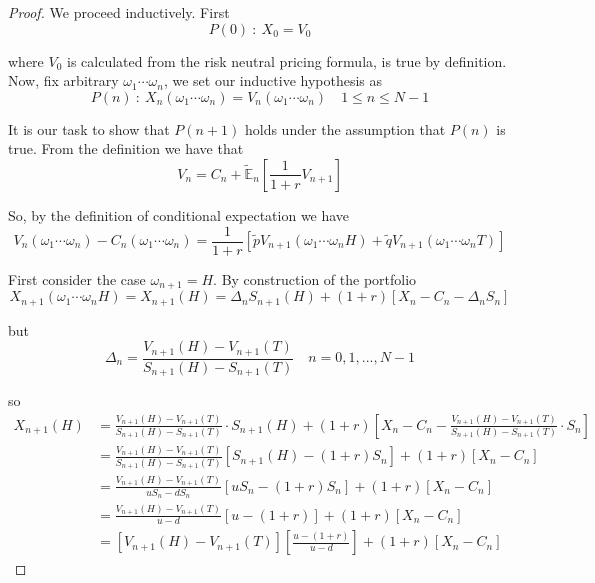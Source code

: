 \documentclass[12pt]{article}
\newlength\tindent
\renewcommand{\indent}{\hspace*{\tindent}}
\newcommand{\E}{\mathbb E}
\begin{document}
\begin{proof} We proceed inductively. First
\begin{equation*}
	P(0)~:~X_0 = V_0
\end{equation*}

where $V_0$ is calculated from the risk neutral pricing formula, is true by definition. Now, fix arbitrary $\omega_1\cdots\omega_n$, we set our inductive hypothesis as
\begin{equation*}
	P(n)~:~X_n(\omega_1\cdots\omega_n) = V_n(\omega_1\cdots\omega_n) \quad 1 \leq n \leq N - 1
\end{equation*}

\indent It is our task to show that $P(n + 1)$ holds under the assumption that $P(n)$ is true. From the definition we have that
\begin{equation*}
	V_n = C_n + \tilde{\E}_n \left[ \frac{1}{1 + r}V_{n + 1} \right]
\end{equation*}

So, by the definition of conditional expectation we have
\begin{equation*}
	V_n(\omega_1\cdots\omega_n) - C_n(\omega_1\cdots\omega_n) = \frac{1}{1 + r}\left[ \tilde{p}V_{n + 1}(\omega_1\cdots\omega_n H) + \tilde{q}V_{n + 1}(\omega_1\cdots\omega_n T)\right] 
\end{equation*}

First consider the case $\omega_{n + 1} = H$. By construction of the portfolio
\begin{equation*}
	X_{n + 1}(\omega_1\cdots\omega_n H) = X_{n + 1}(H) = \Delta_n S_{n + 1}(H) + (1 + r)\left[ X_n - C_n - \Delta_n S_n \right]
\end{equation*}

but
\begin{equation*}
	\Delta_n = \frac{V_{n + 1}(H)  - V_{n + 1}(T)}{ S_{n + 1}(H) - S_{n + 1}(T) } \quad n = 0, 1, ..., N - 1
\end{equation*}

so
\begin{align*}
	X_{n + 1}(H) &= \frac{V_{n + 1}(H)  - V_{n + 1}(T)}{ S_{n + 1}(H) - S_{n + 1}(T) } \cdot S_{n + 1}(H) + (1 + r) \left[ X_n - C_n - \frac{V_{n + 1}(H)  - V_{n + 1}(T)}{ S_{n + 1}(H) - S_{n + 1}(T) } \cdot S_n \right] \\
	&= \frac{V_{n + 1}(H) - V_{n + 1}(T)}{ S_{n + 1}(H) - S_{n + 1}(T) } \left[ S_{n + 1}(H)- (1 + r)S_n \right] + (1 + r)\left[X_n - C_n\right] \\
	&= \frac{V_{n + 1}(H) - V_{n + 1}(T)}{ uS_n - dS_n } \left[ uS_n - (1 + r)S_n \right] + (1 + r)\left[X_n - C_n\right] \\
	&= \frac{V_{n + 1}(H) - V_{n + 1}(T)}{ u - d} \left[ u - (1 + r) \right] + (1 + r)\left[X_n - C_n\right] \\
	&= \left[ V_{n + 1}(H) - V_{n + 1}(T) \right] \left[ \frac{u - (1 + r)}{u - d} \right] + (1 + r)\left[X_n - C_n\right]
\end{align*}	


\end{proof}
\end{document}
